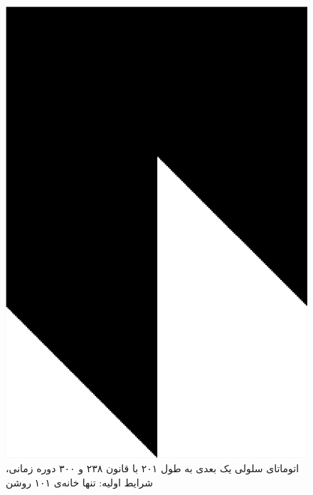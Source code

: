 \documentclass[11pt, a4paper]{article}
\begin{document}
\begin{figure}[!tbp]
\begin{minipage}[b]{0.3\textwidth}
    \includegraphics[width=\textwidth]{q3-238}
    \caption{اتوماتای سلولی یک بعدی به طول ۲۰۱ با قانون ۲۳۸ و ۳۰۰ دوره زمانی، شرایط اولیه: تنها خانه‌ی ۱۰۱ روشن}
    \label{fig:q3-238}
  \end{minipage}
  \hfill
\end{figure}
\end{document}
